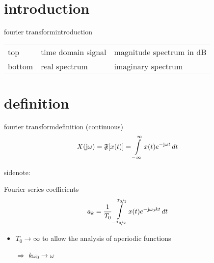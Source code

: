     \section[introduction]{introduction}
        \begin{frame}{fourier transform}{introduction}
            
            \begin{table}%
            \begin{tabular}{lll}
                top & time domain signal & magnitude spectrum in dB\\
                bottom & real spectrum & imaginary spectrum
            \end{tabular}
            \end{table}
            
        \end{frame}	

    \section[definition]{definition}
        \begin{frame}{fourier transform}{definition (continuous)}
            \begin {equation*}\label{eq:fourier_transformation}
                X(\mathrm{j}\omega) = \mathfrak{F}[x(t)] = \int\limits_{-\infty}^{\infty} {x(t) {e}^{-\mathrm{j}\omega t}\, dt}
            \end {equation*}

            \pause
            sidenote: 
            \begin{footnotesize}
            Fourier series coefficients 
            \begin {equation*}\label{eq:fourier_coeff}
                a_k = \frac{1}{T_0}\int\limits_{-\nicefrac{T_0}{2}}^{\nicefrac{T_0}{2}} x(t) {e}^{-\mathrm{j}\omega_0kt}\, dt \nonumber
            \end {equation*}
            
            \begin{itemize}
                \item	$T_0\rightarrow \infty$ to allow the analysis of aperiodic functions
                \item[$\Rightarrow$] $k\omega_0 \rightarrow \omega$
            \end{itemize}
            \end{footnotesize}
        \end{frame}	

